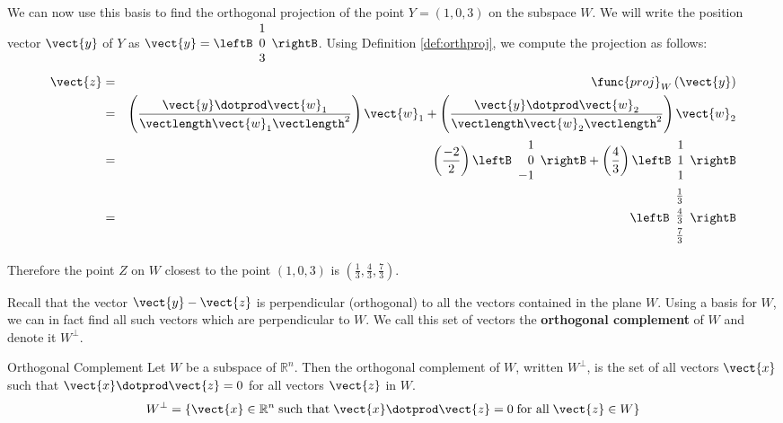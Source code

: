 \begin{solution}
We can now use this basis to find the orthogonal projection of the
point $Y=(1,0,3)$ on the subspace $W$. We will write the position
vector $\vect{y}$ of $Y$ as $\vect{y} = \leftB \begin{array}{c} 1 \\ 0 \\ 3
\end{array} \rightB$. Using Definition \ref{def:orthproj}, we compute the projection as follows:
\begin{eqnarray*}
\vect{z} &=& \func{proj}_{W}\left( \vect{y}\right)\\
&=&
\left( \frac{\vect{y} \dotprod \vect{w}_1}{ \vectlength \vect{w}_1 \vectlength^2}\right) \vect{w}_1
+
\left( \frac{\vect{y} \dotprod \vect{w}_2}{ \vectlength \vect{w}_2 \vectlength^2}\right) \vect{w}_2 \\
&=&
\left( \frac{-2}{2} \right) \leftB
\begin{array}{r}
1 \\
0 \\
-1
\end{array}
\rightB
+
\left( \frac{4}{3} \right)
\leftB
\begin{array}{c}
1 \\
1 \\
1 
\end{array}
\rightB \\
&=& 
\leftB
\begin{array}{c}
\vspace{0.05in}\frac{1}{3} \\
\vspace{0.05in}\frac{4}{3} \\
\vspace{0.05in}\frac{7}{3} 
\end{array}
\rightB
\end{eqnarray*}

Therefore the point $Z$ on $W$ closest to the point $(1,0,3)$  is $\left( \frac{1}{3}, \frac{4}{3}, \frac{7}{3} \right)$. 

\end{solution}

Recall that the vector $\vect{y} - \vect{z}$ is perpendicular
(orthogonal) to all the vectors contained in the plane $W$. Using a
basis for $W$, we can in fact find all such vectors which are
perpendicular to $W$. We call this set of vectors the
\textbf{orthogonal complement}  of $W$ and
denote it $W^{\perp}$.

\begin{definition}{Orthogonal Complement}\label{def:orthcomp}
Let $W$ be a subspace of $\mathbb{R}^n$. Then the orthogonal
complement of $W$, written $W^{\perp}$, is the set of all vectors
$\vect{x}$ such that $\vect{x} \dotprod \vect{z} = 0$ for all vectors
$\vect{z}$ in $W$.
\[
W^{\perp} = \{ \vect{x} \in \mathbb{R}^n \; \mbox{such that} \;
\vect{x} \dotprod \vect{z} = 0 \; \mbox{for all} \; \vect{z} \in W \}
\]
\end{definition}

